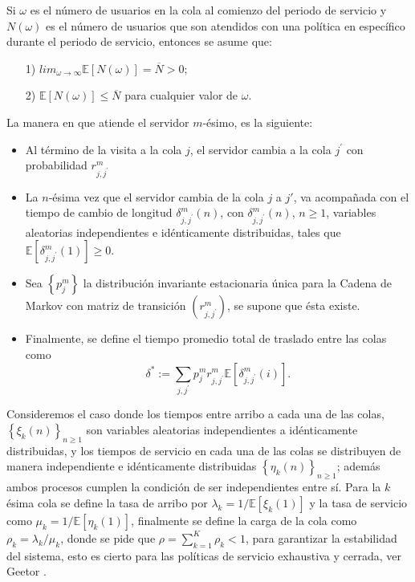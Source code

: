 \documentclass{article}
\newcommand{\esp}{\mathbb{E}}
\numberwithin{equation}{section}
\begin{document}
Si $\omega$ es el n\'umero de usuarios en la cola al comienzo del periodo de servicio y $N\left(\omega\right)$ es el n\'umero de usuarios que son atendidos con una pol\'itica en espec\'ifico durante el periodo de servicio, entonces se asume que:
\begin{itemize}
\item[1)]\label{S1}$lim_{\omega\rightarrow\infty}\esp\left[N\left(\omega\right)\right]=\overline{N}>0$;
\item[2)]\label{S2}$\esp\left[N\left(\omega\right)\right]\leq\overline{N}$
para cualquier valor de $\omega$.
\end{itemize}
La manera en que atiende el servidor $m$-\'esimo, es la siguiente:
\begin{itemize}
\item Al t\'ermino de la visita a la cola $j$, el servidor cambia a la cola $j^{'}$ con probabilidad $r_{j,j^{'}}^{m}$
\item La $n$-\'esima vez que el servidor cambia de la cola $j$ a $j'$, va acompa\~nada con el tiempo de cambio de longitud
$\delta_{j,j^{'}}^{m}\left(n\right)$, con $\delta_{j,j^{'}}^{m}\left(n\right)$, $n\geq1$, variables aleatorias independientes e id\'enticamente distribuidas, tales que $\esp\left[\delta_{j,j^{'}}^{m}\left(1\right)\right]\geq0$.

\item Sea $\left\{p_{j}^{m}\right\}$ la distribuci\'on invariante estacionaria \'unica para la Cadena de Markov con matriz de transici\'on $\left(r_{j,j^{'}}^{m}\right)$, se supone que \'esta existe.

\item Finalmente, se define el tiempo promedio total de traslado entre las colas como
\begin{equation}
\delta^{*}:=\sum_{j,j^{'}}p_{j}^{m}r_{j,j^{'}}^{m}\esp\left[\delta_{j,j^{'}}^{m}\left(i\right)\right].
\end{equation}
\end{itemize}

Consideremos el caso donde los tiempos entre arribo a cada una de las colas, $\left\{\xi_{k}\left(n\right)\right\}_{n\geq1}$ son variables aleatorias independientes a id\'enticamente distribuidas, y los tiempos de servicio en cada una de las colas se distribuyen de manera independiente e id\'enticamente distribuidas $\left\{\eta_{k}\left(n\right)\right\}_{n\geq1}$; adem\'as ambos procesos cumplen la condici\'on de ser independientes entre s\'i. Para la $k$ \'esima cola se define la tasa de arribo por $\lambda_{k}=1/\esp\left[\xi_{k}\left(1\right)\right]$ y la tasa de servicio como $\mu_{k}=1/\esp\left[\eta_{k}\left(1\right)\right]$, finalmente se define la carga de la cola como $\rho_{k}=\lambda_{k}/\mu_{k}$, donde se pide que $\rho=\sum_{k=1}^{K}\rho_{k}<1$, para garantizar la estabilidad del sistema, esto es cierto para las pol\'iticas de servicio exhaustiva y cerrada, ver Geetor \cite{Getoor}.\\
\end{document}
